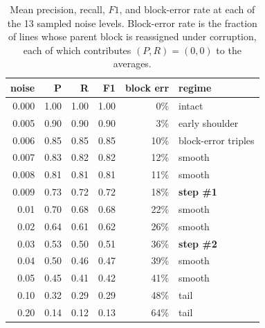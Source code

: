 \documentclass{article}
\theoremstyle{definition}
\begin{document}
\begin{table}[h]
      \centering
      \small
      \begin{tabular}{rrrrrl}
            \toprule
            \textbf{noise} & \textbf{P} & \textbf{R} & \textbf{F1} & \textbf{block err} & \textbf{regime}     \\
            \midrule
            0.000          & 1.00       & 1.00       & 1.00        & 0\%                & intact              \\
            0.005          & 0.90       & 0.90       & 0.90        & 3\%                & early shoulder      \\
            0.006          & 0.85       & 0.85       & 0.85        & 10\%               & block-error triples \\
            0.007          & 0.83       & 0.82       & 0.82        & 12\%               & smooth              \\
            0.008          & 0.81       & 0.81       & 0.81        & 11\%               & smooth              \\
            0.009          & 0.73       & 0.72       & 0.72        & 18\%               & \textbf{step \#1}   \\
            0.01           & 0.70       & 0.68       & 0.68        & 22\%               & smooth              \\
            0.02           & 0.64       & 0.61       & 0.62        & 26\%               & smooth              \\
            0.03           & 0.53       & 0.50       & 0.51        & 36\%               & \textbf{step \#2}   \\
            0.04           & 0.50       & 0.46       & 0.47        & 39\%               & smooth              \\
            0.05           & 0.45       & 0.41       & 0.42        & 41\%               & smooth              \\
            0.10           & 0.32       & 0.29       & 0.29        & 48\%               & tail                \\
            0.20           & 0.14       & 0.12       & 0.13        & 64\%               & tail                \\
            \bottomrule
      \end{tabular}
      \caption{Mean precision, recall, $F1$, and block-error rate at each
            of the 13 sampled noise levels.  Block-error rate is the fraction
            of lines whose parent block is reassigned under corruption, each
            of which contributes $(P, R) = (0, 0)$ to the averages.}
      \label{tab:bench-pr}
\end{table}
\end{document}
